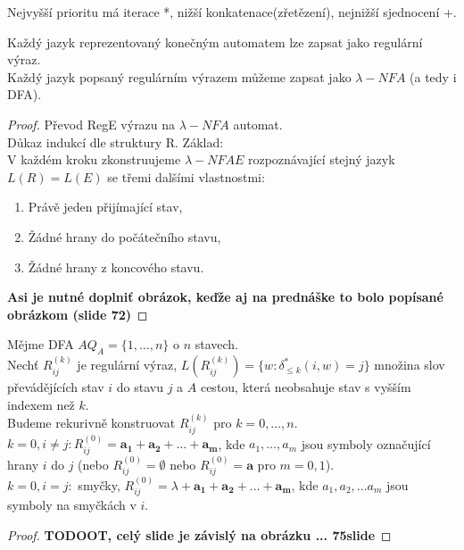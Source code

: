 \documentclass[../main.tex]{subfiles}
\begin{document}
\begin{definition}[Priorita]
    Nejvyšší prioritu má iterace *, nižší konkatenace(zřetězení), nejnižší sjednocení +.
\end{definition}

\begin{theorem}
    Každý jazyk reprezentovaný konečným automatem lze zapsat jako regulární výraz.\\
    Každý jazyk popsaný regulárním výrazem můžeme zapsat jako $\lambda -NFA$ (a tedy i DFA).
\end{theorem}
\begin{proof}
    Převod RegE výrazu na $\lambda -NFA$ automat.\\
    Důkaz indukcí dle struktury R. Základ:\\
    V každém kroku zkonstruujeme $\lambda - NFA E$ rozpoznávající stejný jazyk $L(R) = L(E)$ se třemi dalšími vlastnostmi:
    \begin{enumerate}
        \item Právě jeden přijímající stav,
        \item Žádné hrany do počátečního stavu,
        \item Žádné hrany z koncového stavu.
    \end{enumerate}
    \textbf{Asi je nutné doplniť obrázok, keďže aj na prednáške to bolo popísané obrázkom (slide 72)}
\end{proof}

\begin{definition}
    Mějme DFA $A Q_A = \{1,\dots,n\}$ o $n$ stavech.\\
    Nechť $R^(k)_{ij}$ je regulární výraz, $L(R^(k)_{ij}) = \{w : \delta^*_{\leq k}(i,w) = j\}$ množina slov
    převádějících stav $i$ do stavu $j$ a $A$ cestou, která neobsahuje stav s vyšším indexem než $k$.\\
    Budeme rekurivně konstruovat $R^(k)_{ij}$ pro $k = 0,\dots, n$.\\
    $k = 0, i\neq j : R^(0)_{ij} = \mathbf{a_1} + \mathbf{a_2} + \dots + \mathbf{a_m}$, kde $a_1, \dots, a_m$ jsou
    symboly označující hrany $i$ do $j$ (nebo $R^(0)_{ij} = \emptyset$ nebo $R^(0)_{ij} = \mathbf{a}$ pro $m = 0,1$).\\
    $k = 0, i = j: $ smyčky, $R^(0)_{ij} = \lambda + \mathbf{a_1} + \mathbf{a_2} +\dots + \mathbf{a_m}$, kde 
    $a_1, a_2,\dots a_m$ jsou symboly na smyčkách v $i$.
\end{definition}
\begin{proof}
    \textbf{TODOOT, celý slide je závislý na obrázku ... 75slide}
\end{proof}
\end{document}
